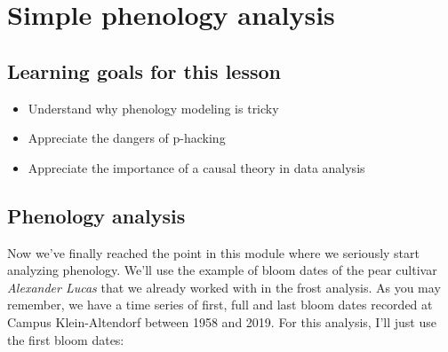 \documentclass[
]{book}
\newenvironment{Shaded}{\begin{snugshade}}{\end{snugshade}}
\newcommand{\DataTypeTok}[1]{\textcolor[rgb]{0.13,0.29,0.53}{#1}}
\newcommand{\DecValTok}[1]{\textcolor[rgb]{0.00,0.00,0.81}{#1}}
\newcommand{\KeywordTok}[1]{\textcolor[rgb]{0.13,0.29,0.53}{\textbf{#1}}}
\newcommand{\NormalTok}[1]{#1}
\newcommand{\OperatorTok}[1]{\textcolor[rgb]{0.81,0.36,0.00}{\textbf{#1}}}
\newcommand{\StringTok}[1]{\textcolor[rgb]{0.31,0.60,0.02}{#1}}
\providecommand{\tightlist}{%
  \setlength{\itemsep}{0pt}\setlength{\parskip}{0pt}}
\begin{document}
\hypertarget{simple_phenology}{%
\chapter{Simple phenology analysis}\label{simple_phenology}}

\hypertarget{goals_simple_phenology}{%
\section*{Learning goals for this lesson}\label{goals_simple_phenology}}

\begin{itemize}
\tightlist
\item
  Understand why phenology modeling is tricky
\item
  Appreciate the dangers of p-hacking
\item
  Appreciate the importance of a causal theory in data analysis
\end{itemize}

\hypertarget{phenology-analysis}{%
\section{Phenology analysis}\label{phenology-analysis}}

Now we've finally reached the point in this module where we seriously start analyzing phenology. We'll use the example of bloom dates of the pear cultivar \emph{Alexander Lucas} that we already worked with in the frost analysis. As you may remember, we have a time series of first, full and last bloom dates recorded at Campus Klein-Altendorf between 1958 and 2019. For this analysis, I'll just use the first bloom dates:

\begin{Shaded}
\end{Shaded}
\end{document}
